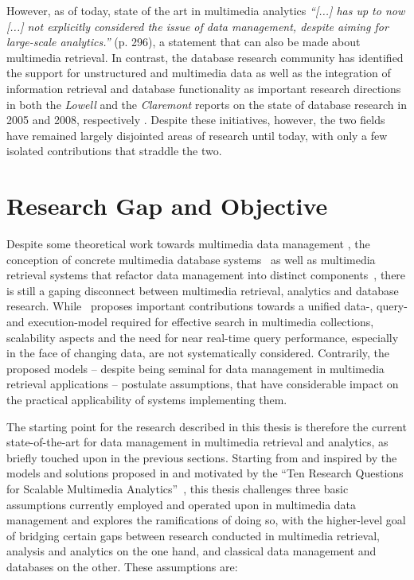 However, as of today, state of the art in multimedia analytics \emph{``[...] has up to now [...] not explicitly considered the issue of data management, despite aiming for large-scale analytics.''} \cite{Jonsson:2016Ten} (p. 296), a statement that can also be made about multimedia retrieval. In contrast, the database research community has identified the support for unstructured and multimedia data as well as the integration of information retrieval and database functionality as important research directions in both the \emph{Lowell} and the \emph{Claremont} reports on the state of database research in 2005 and 2008, respectively \cite{Abiteboul:2005Lowell,Agrawal:2008Claremont}. Despite these initiatives, however, the two fields have remained largely disjointed areas of research until today, with only a few isolated contributions that straddle the two.

\section{Research Gap and Objective}
\label{section:research_gap}

Despite some theoretical work towards multimedia data management \cite{Marcus:1996Foundations,Adjeroh:1997Multimedia}, the conception of concrete multimedia database systems~\cite{Giangreco:2016Adam,Yang:2020Pase,Wang:2021Milvus} as well as multimedia retrieval systems that refactor data management into distinct components~\cite{Carey:1995Towards,Rossetto:2016Vitrivr,Gasser:2019Multimodal}, there is still a gaping disconnect between multimedia retrieval, analytics and database research. While~\cite{Giangreco:2018Database} proposes important contributions towards a unified data-, query- and execution-model required for effective search in multimedia collections, scalability aspects and the need for near real-time query performance, especially in the face of changing data, are not systematically considered. Contrarily, the proposed models -- despite being seminal for data management in multimedia retrieval applications -- postulate assumptions, that have considerable impact on the practical applicability of systems implementing them.

The starting point for the research described in this thesis is therefore the current state-of-the-art for data management in multimedia retrieval and analytics, as briefly touched upon in the previous sections. Starting from and inspired by the models and solutions proposed in \cite{Giangreco:2016Adam,Giangreco:2018Database} and motivated by the ``Ten Research Questions for Scalable Multimedia Analytics''~\cite{Jonsson:2016Ten}, this thesis challenges three basic assumptions currently employed and operated upon in multimedia data management and explores the ramifications of doing so, with the higher-level goal of bridging certain gaps between research conducted in multimedia retrieval, analysis and analytics on the one hand, and classical data management and databases on the other. These assumptions are:

